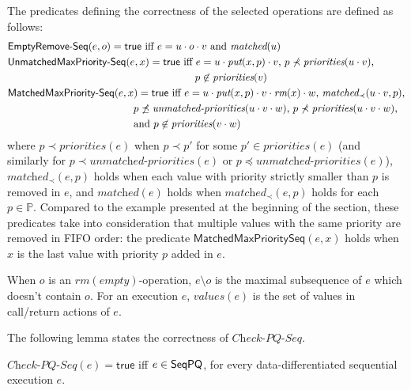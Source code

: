 \documentclass[a4paper,UKenglish]{lipics-v2016}
\begin{document}
The predicates defining the correctness of the selected operations are defined as follows:
\begin{align*}
&\mathsf{EmptyRemove\text{-}Seq}(e,o)=\mathsf{true} \mbox{ iff  $e= u\cdot o\cdot v$ and $\textit{matched}(u)$} \\
&\mathsf{UnmatchedMaxPriority\text{-}Seq}(e,x)=\mathsf{true}  \mbox{ iff  $e= u\cdot \textit{put}(x,p)\cdot v$, $p\not\prec \textit{priorities}(u\cdot v)$,} \\
&\hspace{6.4cm}p\not\in \textit{priorities}(v) \\
&\mathsf{MatchedMaxPriority\text{-}Seq}(e,x)=\mathsf{true} \mbox{ iff  $e= u\cdot \textit{put}(x,p)\cdot v\cdot \textit{rm}(x)\cdot w$, $\textit{matched}_\prec(u\cdot v,p)$,} \\
&\hspace{4.3cm}\mbox{$p\not\preceq \textit{unmatched-priorities}(u\cdot v\cdot w)$, $p\not\prec \textit{priorities}(u\cdot v\cdot w)$,} \\
&\hspace{4.3cm}\mbox{and  $p\not\in \textit{priorities}(v\cdot w)$}
\end{align*}
where $p\prec \textit{priorities}(e)$ when $p\prec p'$ for some $p'\in \textit{priorities}(e)$ (and similarly for $p\prec \textit{unmatched-priorities}(e)$ or $p\preceq \textit{unmatched-priorities}(e)$),
$\textit{matched}_\prec(e,p)$ holds when each value with priority strictly smaller than $p$ is removed in $e$, and $\textit{matched}(e)$ holds when $\textit{matched}_\prec(e,p)$ holds for each $p\in\mathbb{P}$. Compared to the example presented at the beginning of the section, these predicates take into consideration that multiple values with the same priority are removed in FIFO order: the predicate $\mathsf{MatchedMaxPrioritySeq}(e,x)$ holds when $x$ is the last value with priority $p$ added in $e$.

When $o$ is an $\textit{rm}(\textit{empty})$-operation, $e\setminus o$ is the maximal subsequence of $e$ which doesn't contain $o$. For an execution $e$, $\textit{values}(e)$ is the set of values  in call/return actions of $e$.





The following lemma states the correctness of $\textit{Check-PQ-Seq}$. 

\begin{lemma}
\label{lemma:EPQ rules and semantics}
$\textit{Check-PQ-Seq}(e)=\mathsf{true}$ iff $e\in \mathsf{SeqPQ}$, for every data-differentiated sequential execution $e$.
\end{lemma}
\end{document}
